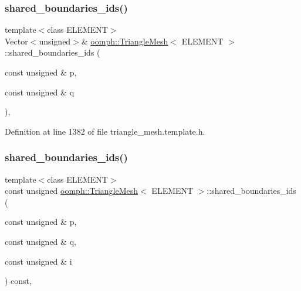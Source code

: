 \mbox{\label{classoomph_1_1TriangleMesh_ad3de21bc0c42218a49b52d815fb8121e}} 
\subsubsection{\texorpdfstring{shared\+\_\+boundaries\+\_\+ids()}{shared\_boundaries\_ids()}\hspace{0.1cm}{\footnotesize\ttfamily [6/7]}}
{\footnotesize\ttfamily template$<$class E\+L\+E\+M\+E\+NT$>$ \\
Vector$<$unsigned$>$\& \hyperlink{classoomph_1_1TriangleMesh}{oomph\+::\+Triangle\+Mesh}$<$ E\+L\+E\+M\+E\+NT $>$\+::shared\+\_\+boundaries\+\_\+ids (\begin{DoxyParamCaption}\item[{const unsigned \&}]{p,  }\item[{const unsigned \&}]{q }\end{DoxyParamCaption})\hspace{0.3cm}{\ttfamily [inline]}, {\ttfamily [protected]}}



Definition at line 1382 of file triangle\+\_\+mesh.\+template.\+h.

\mbox{\label{classoomph_1_1TriangleMesh_a31d4c906ddbb9b3aa830e32694870709}} 
\subsubsection{\texorpdfstring{shared\+\_\+boundaries\+\_\+ids()}{shared\_boundaries\_ids()}\hspace{0.1cm}{\footnotesize\ttfamily [7/7]}}
{\footnotesize\ttfamily template$<$class E\+L\+E\+M\+E\+NT$>$ \\
const unsigned \hyperlink{classoomph_1_1TriangleMesh}{oomph\+::\+Triangle\+Mesh}$<$ E\+L\+E\+M\+E\+NT $>$\+::shared\+\_\+boundaries\+\_\+ids (\begin{DoxyParamCaption}\item[{const unsigned \&}]{p,  }\item[{const unsigned \&}]{q,  }\item[{const unsigned \&}]{i }\end{DoxyParamCaption}) const\hspace{0.3cm}{\ttfamily [inline]}, {\ttfamily [protected]}}



